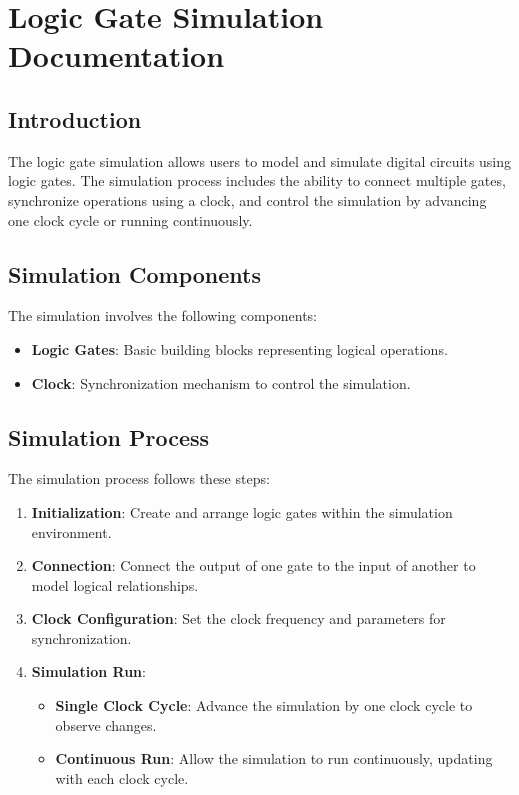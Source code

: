 \documentclass{article}
\begin{document}
\section*{Logic Gate Simulation Documentation}

\subsection*{Introduction}

The logic gate simulation allows users to model and simulate digital circuits using logic gates. The simulation process includes the ability to connect multiple gates, synchronize operations using a clock, and control the simulation by advancing one clock cycle or running continuously.

\subsection*{Simulation Components}

The simulation involves the following components:

\begin{itemize}
    \item \textbf{Logic Gates}: Basic building blocks representing logical operations.
    \item \textbf{Clock}: Synchronization mechanism to control the simulation.
\end{itemize}

\subsection*{Simulation Process}

The simulation process follows these steps:

\begin{enumerate}
    \item \textbf{Initialization}: Create and arrange logic gates within the simulation environment.
    \item \textbf{Connection}: Connect the output of one gate to the input of another to model logical relationships.
    \item \textbf{Clock Configuration}: Set the clock frequency and parameters for synchronization.
    \item \textbf{Simulation Run}:
        \begin{itemize}
            \item \textbf{Single Clock Cycle}: Advance the simulation by one clock cycle to observe changes.
            \item \textbf{Continuous Run}: Allow the simulation to run continuously, updating with each clock cycle.
        \end{itemize}
\end{enumerate}
\end{document}
